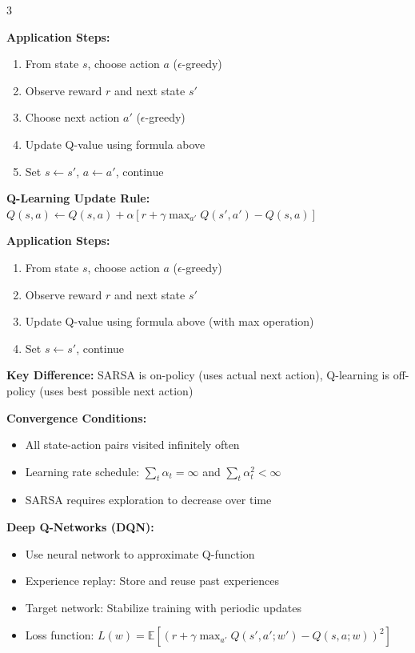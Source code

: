 \documentclass[10pt,landscape]{article}
\begin{document}
\begin{multicols}{3}
\begin{tcolorbox}[breakable, title=11.1 Q-Learning and SARSA, colback=rl]
\textbf{Application Steps:}
\begin{enumerate}[leftmargin=*,noitemsep,topsep=0pt]
    \item From state $s$, choose action $a$ ($\epsilon$-greedy)
    \item Observe reward $r$ and next state $s'$
    \item Choose next action $a'$ ($\epsilon$-greedy)
    \item Update Q-value using formula above
    \item Set $s \leftarrow s'$, $a \leftarrow a'$, continue
\end{enumerate}

\textbf{Q-Learning Update Rule:}
$Q(s, a) \leftarrow Q(s, a) + \alpha[r + \gamma \max_{a'} Q(s', a') - Q(s, a)]$

\textbf{Application Steps:}
\begin{enumerate}[leftmargin=*,noitemsep,topsep=0pt]
    \item From state $s$, choose action $a$ ($\epsilon$-greedy)
    \item Observe reward $r$ and next state $s'$
    \item Update Q-value using formula above (with max operation)
    \item Set $s \leftarrow s'$, continue
\end{enumerate}

\textbf{Key Difference:} SARSA is on-policy (uses actual next action), Q-learning is off-policy (uses best possible next action)

\textbf{Convergence Conditions:}
\begin{itemize}[leftmargin=*,noitemsep,topsep=0pt]
    \item All state-action pairs visited infinitely often
    \item Learning rate schedule: $\sum_t \alpha_t = \infty$ and $\sum_t \alpha_t^2 < \infty$
    \item SARSA requires exploration to decrease over time
\end{itemize}

\textbf{Deep Q-Networks (DQN):}
\begin{itemize}[leftmargin=*,noitemsep,topsep=0pt]
    \item Use neural network to approximate Q-function
    \item Experience replay: Store and reuse past experiences
    \item Target network: Stabilize training with periodic updates
    \item Loss function: $L(w) = \mathbb{E}[(r + \gamma \max_{a'} Q(s',a';w') - Q(s,a;w))^2]$
\end{itemize}
\end{tcolorbox}


\end{multicols}
\end{document}
